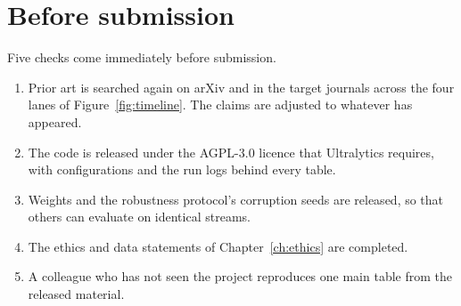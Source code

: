 \section{Before submission}
\label{sec:submission}

Five checks come immediately before submission.
\begin{enumerate}
  \item Prior art is searched again on arXiv and in the target journals
        across the four lanes of Figure~\ref{fig:timeline}. The claims are
        adjusted to whatever has appeared.
  \item The code is released under the AGPL-3.0 licence that Ultralytics
        requires, with configurations and the run logs behind every table.
  \item Weights and the robustness protocol's corruption seeds are released,
        so that others can evaluate on identical streams.
  \item The ethics and data statements of Chapter~\ref{ch:ethics} are
        completed.
  \item A colleague who has not seen the project reproduces one main table
        from the released material.
\end{enumerate}

